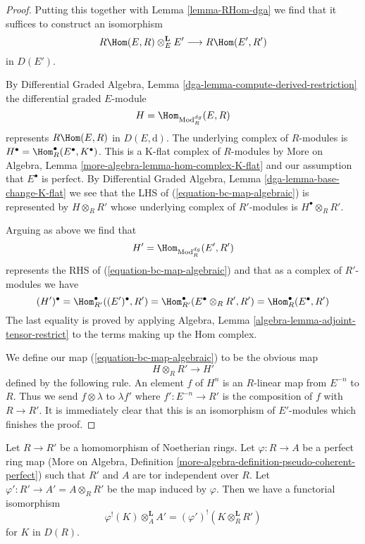\begin{proof}
\medskip\noindent
Putting this together with Lemma \ref{lemma-RHom-dga} we find that it suffices
to construct an isomorphism
\begin{equation}
\label{equation-bc-map-algebraic}
R\Hom(E, R) \otimes_E^\mathbf{L} E'
\longrightarrow
R\Hom(E', R')
\end{equation}
in $D(E')$.

\medskip\noindent
By Differential Graded Algebra, Lemma
\ref{dga-lemma-compute-derived-restriction}
the differential graded $E$-module
$$
H = \Hom_{\text{Mod}^{dg}_R}(E, R)
$$
represents $R\Hom(E, R)$ in $D(E, \text{d})$.
The underlying complex of $R$-modules is
$H^\bullet = \Hom^\bullet_R(E^\bullet, K^\bullet)$. This is a
K-flat complex of $R$-modules by
More on Algebra, Lemma \ref{more-algebra-lemma-hom-complex-K-flat}
and our assumption that $E^\bullet$ is perfect.
By Differential Graded Algebra, Lemma \ref{dga-lemma-base-change-K-flat}
we see that the LHS of (\ref{equation-bc-map-algebraic})
is represented by $H \otimes_R R'$ whose
underlying complex of $R'$-modules is $H^\bullet \otimes_R R'$.

\medskip\noindent
Arguing as above we find that
$$
H' = \Hom_{\text{Mod}^{dg}_R}(E', R')
$$
represents the RHS of (\ref{equation-bc-map-algebraic})
and that as a complex of $R'$-modules we have
$$
(H')^\bullet =
\Hom^\bullet_{R'}((E')^\bullet, R') =
\Hom^\bullet_{R'}(E^\bullet \otimes_R R', R') =
\Hom^\bullet_R(E^\bullet, R')
$$
The last equality is proved by applying
Algebra, Lemma \ref{algebra-lemma-adjoint-tensor-restrict}
to the terms making up the Hom complex.

\medskip\noindent
We define our map (\ref{equation-bc-map-algebraic}) to be the obvious map
$$
H \otimes_R R' \longrightarrow H'
$$
defined by the following rule. An element $f$ of $H^n$ is an $R$-linear
map from $E^{-n}$ to $R$. Thus we send $f \otimes \lambda$ to
$\lambda f'$ where $f' : E^{-n} \to R'$ is the composition of
$f$ with $R \to R'$. It is immediately clear that this is
an isomorphism of $E'$-modules which finishes the proof.
\end{proof}

\begin{lemma}
\label{lemma-bc}
Let $R \to R'$ be a homomorphism of Noetherian rings.
Let $\varphi : R \to A$ be a perfect ring map
(More on Algebra, Definition
\ref{more-algebra-definition-pseudo-coherent-perfect})
such that $R'$ and $A$ are tor independent over $R$.
Let $\varphi' : R' \to A' = A \otimes_R R'$ be the map induced by $\varphi$.
Then we have a functorial isomorphism
$$
\varphi^!(K) \otimes_A^\mathbf{L} A' =
(\varphi')^!(K \otimes_R^\mathbf{L} R')
$$
for $K$ in $D(R)$.
\end{lemma}

